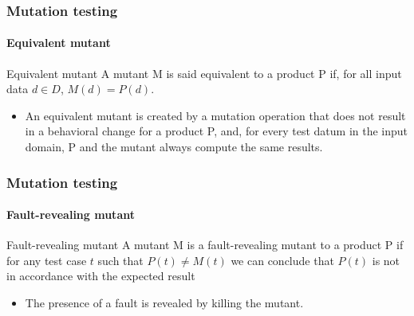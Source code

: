 \begin{frame}
\frametitle{Mutation testing}
\framesubtitle{Equivalent mutant}
\label{concept:equivalent-mutant}

\begin{block:concept}{Equivalent mutant}
A mutant M is said equivalent to a product P if, for all input data $d \in D$,
$M(d) = P(d)$.
\end{block:concept}

\begin{block:fact}{}
\begin{itemize}
	\item An equivalent mutant is created by a mutation operation that does not
	result in a behavioral change for a product P, and, for every test datum in
	the input domain, P and the mutant always compute the same results.
\end{itemize}
\end{block:fact}

\end{frame}


\begin{frame}
\frametitle{Mutation testing}
\framesubtitle{Fault-revealing mutant}
\label{concept:fault-revealing-mutant}

\begin{block:concept}{Fault-revealing mutant}
A mutant M is a fault-revealing mutant to a product P if for any test case $t$
such that $P(t) \neq M(t)$ we can conclude that $P(t)$ is not in accordance
with the expected result
\end{block:concept}

\begin{block:fact}{}
\begin{itemize}
	\item The presence of a fault is revealed by killing the mutant.
\end{itemize}
\end{block:fact}
\end{frame}



